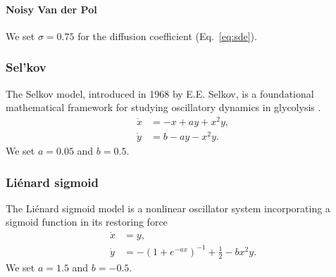 \documentclass{article}
\theoremstyle{definition} \newtheorem{definition}{Definition}  \newtheorem{example}{Example}
\theoremstyle{remark} \newtheorem{remark}{Remark}
\newcounter{ct}
\begin{document}
\paragraph{Noisy Van der Pol}  
We set $\sigma = 0.75$ for the diffusion coefficient (Eq.~\ref{eq:sde}).






\subsubsection{Sel'kov}
The Selkov model, introduced in 1968 by E.E. Selkov, is a foundational mathematical framework for studying oscillatory dynamics in glycolysis \citep{selkov1968self}.
\begin{equation}
\begin{aligned}
\dot{x} &= - x + ay + x^2y, \\
\dot{y} &= b - ay - x^2y.
\end{aligned}
\end{equation}
We set $a= 0.05$ and $b=0.5$. 



\subsubsection{Li\'enard sigmoid}
The Li\'enard sigmoid model is a nonlinear oscillator system incorporating a sigmoid function in its restoring force
\begin{equation}
\begin{aligned}
\dot{x} &= y, \\
\dot{y} &= - (1+e^{-ax})^{-1} + \tfrac{1}{2} - bx^2y.
\end{aligned}
\end{equation}
We set $a= 1.5$ and $b=-0.5$. 
\end{document}
